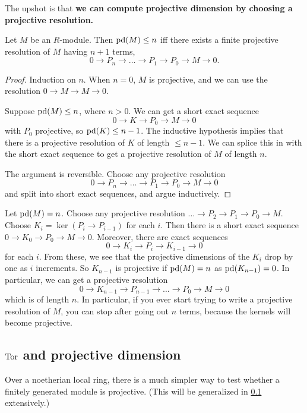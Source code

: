 The upshot is that \textbf{we can compute projective dimension
by choosing a
projective resolution.}
\begin{proposition}
Let $M$ be an $R$-module. Then $\mathrm{pd}(M) \leq n$ iff there exists
a finite
projective resolution of $M$ having $n+1$ terms,
\[ 0 \to P_n \to \dots \to P_1 \to P_0 \to M \to 0.  \]
\end{proposition}
\begin{proof}
Induction on $n$. When $n = 0$, $M$ is projective, and we can
use the
resolution $0 \to M \to M \to 0$.

Suppose $\mathrm{pd}(M) \leq n$, where $n >0$. We can get a short exact
sequence
\[ 0 \to K \to P_0 \to M \to 0  \]
with $P_0$ projective, so $\mathrm{pd}(K) \leq n-1$. The inductive
hypothesis implies
that there is a projective resolution of $K$ of length $\leq
n-1$. We can
splice this in with the short exact sequence to get a projective
resolution of
$M$ of length $n$.

The argument is reversible. Choose any projective resolution
\[  0 \to P_n \to \dots \to P_1 \to P_0 \to M \to 0 \]
and split into short exact sequences, and argue inductively.
\end{proof}


Let $\mathrm{pd}(M) = n$. Choose any projective resolution $\dots \to
P_2 \to P_1 \to
P_0 \to M$. Choose $K_i = \ker(P_i \to P_{i-1})$ for each $i$.
Then there is a short exact sequence $0 \to K_0 \to P_0 \to M
\to 0$. Moreover,
there are exact sequences
\[ 0 \to K_i \to P_i \to K_{i-1} \to 0  \]
for each $i$. From these, we see that the projective dimensions
of the $K_i$
drop by one as $i$ increments. So $K_{n-1}$ is projective if
$\mathrm{pd}(M) = n$ as
$\mathrm{pd}(K_{n-1})=0$. In particular, we can get a projective
resolution
\[ 0 \to K_{n-1} \to P_{n-1} \to \dots \to P_0 \to M \to 0  \]
which is of length $n$.
In particular, if you ever start trying to write a projective
resolution of
$M$, you can stop after going out $n$ terms, because the kernels
will become
projective.

\subsection{$\operatorname{Tor}$ and projective dimension}

Over  a noetherian local ring, there is a much simpler way to test whether a
finitely generated module is projective. (This will be generalized in \cref{}
extensively.)

